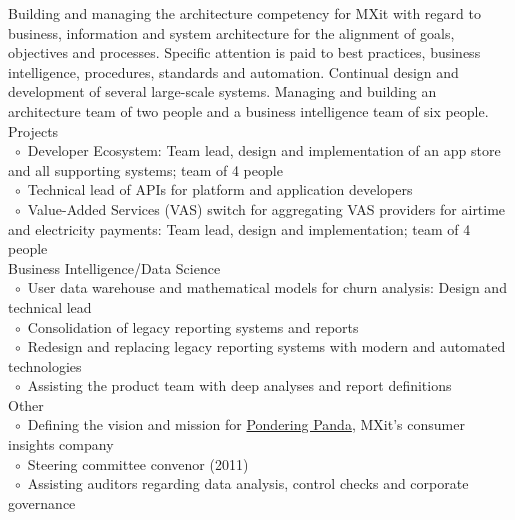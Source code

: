 \documentclass[10pt,a4paper,final]{columncv}
\newcommand{\cvitembullet}{~$\circ$~}
\newcommand{\cvitempbullet}{\phantom{\cvitembullet}}
\begin{document}
\begin{cvenv}
         {Building and managing the architecture competency for MXit with regard to
         business, information and system architecture for the alignment of goals, 
         objectives and processes. Specific attention is paid to best practices, business 
         intelligence, procedures, standards and automation. Continual design and 
         development of several large-scale systems. Managing and building an architecture
         team of two people and a business intelligence team of six people.}
         {Projects \\
         \cvitembullet Developer Ecosystem: Team lead, design and implementation 
         \cvitempbullet of an app store and all supporting systems; team of 4 people \\
         \cvitembullet Technical lead of APIs for platform and application developers \\
         \cvitembullet Value-Added Services (VAS) switch for aggregating VAS providers 
         \cvitempbullet for airtime and electricity payments: Team lead, design and 
         \cvitempbullet implementation; team of 4 people \\
         Business Intelligence/Data Science \\
         \cvitembullet User data warehouse and mathematical models for churn analysis: 
         \cvitempbullet Design and technical lead \\
         \cvitembullet Consolidation of legacy reporting systems and reports \\
         \cvitembullet Redesign and replacing legacy reporting systems with modern and 
         \cvitempbullet automated technologies \\
         \cvitembullet Assisting the product team with deep analyses and report 
         \cvitempbullet definitions \\
         Other \\
         \cvitembullet Defining the vision and mission for \href{http://www.ponderingpanda.com/}{Pondering Panda}, MXit's
         \cvitempbullet consumer insights company \\
         \cvitembullet Steering committee convenor (2011) \\
         \cvitembullet Assisting auditors regarding data analysis, control checks and 
         \cvitempbullet corporate governance \\
}
\end{cvenv}
\end{document}
